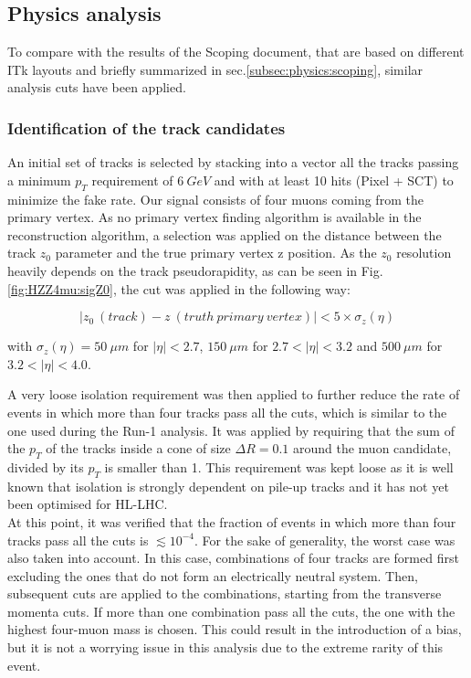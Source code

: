 \documentclass[a4paper,twoside,12pt]{article}
\begin{document}
\subsection{Physics analysis}\label{sec:physics:analysis}
To compare with the results of the Scoping document, that 
are based on different ITk layouts and briefly summarized in sec.\ref{subsec:physics:scoping}, 
similar analysis cuts have been applied. \\

\subsubsection{Identification of the track candidates}
An initial set of tracks is selected by stacking into a vector all the tracks passing a minimum
$p_{T}$ requirement of $6\ GeV$ and with at least 10 hits (Pixel + SCT) to minimize the fake rate. 
Our signal consists
of four muons coming from the primary vertex. As no primary vertex finding algorithm
is available in the reconstruction algorithm, 
a selection was applied on the distance between the track $z_0$ parameter and the true primary vertex
z position. As the 
$z_0$ resolution heavily depends on the track pseudorapidity, as can be seen in Fig.
\ref{fig:HZZ4mu:sigZ0}, the cut was applied in the following way:

\begin{equation*}
|z_0\ (track) - z\ (truth\ primary\ vertex)| < 5 \times \sigma_{z} (\eta)
\end{equation*}

with $\sigma_{z} (\eta) = 50\ \mu m$ for $|\eta| < 2.7$, $150\ \mu m$ for $2.7 < |\eta| < 3.2$
and $500\ \mu m$ for $3.2 < |\eta| < 4.0$. 

A very loose isolation requirement was then applied to further reduce the rate of events
in which more than four tracks pass all the cuts, which is similar to the one used during
the Run-1 analysis\cite{HZZ4mu_run1}. It was applied by requiring that the sum of the 
$p_T$ of the tracks inside a cone of size $\Delta R = 0.1$ around the muon
candidate, divided by its $p_T$ is smaller than 1. This requirement was kept loose as 
it is well known that isolation is strongly dependent on pile-up tracks and it has not yet
been optimised for HL-LHC.\\

At this point, it was verified that the fraction of events in which more than four tracks
pass all the cuts is $\lesssim 10^{-4}$. For the sake of generality, the worst 
case was also taken into account. In this case, combinations of four tracks are formed
first excluding the ones that do not form an electrically neutral system. Then, subsequent
cuts are applied to the combinations, starting from the transverse momenta cuts. If more
than one combination pass all the cuts, the one with the highest four-muon mass is chosen. 
This could result in the introduction of a bias, but it is not a worrying issue in this analysis due to
the extreme rarity of this event.\\
\end{document}
